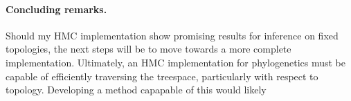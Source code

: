 \documentclass{article}
\begin{document}
    \paragraph*{Concluding remarks.}
    Should my \ac{HMC} implementation show promising results for inference on
        fixed topologies, the next steps will be to move towards a more
        complete implementation.
    Ultimately, an \ac{HMC} implementation for phylogenetics must be capable of
        efficiently traversing the treespace, particularly with respect to
        topology.
    Developing a method capapable of this would likely

    \printbibliography
\end{document}
